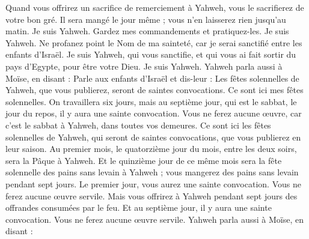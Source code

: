 \begin{multicols}{2}
Quand vous offrirez un sacrifice de remerciement à Yahweh, vous le sacrifierez de votre bon gré.
Il sera mangé le jour même ; vous n'en laisserez rien jusqu'au matin. Je suis Yahweh.
Gardez mes commandements et pratiquez-les. Je suis Yahweh.
Ne profanez point le Nom de ma sainteté, car je serai sanctifié entre les enfants d'Israël. Je suis Yahweh, qui vous sanctifie,
et qui vous ai fait sortir du pays d'Egypte, pour être votre Dieu. Je suis Yahweh.
\VerseOne{}Yahweh parla aussi à Moïse, en disant :
Parle aux enfants d'Israël et dis-leur : Les fêtes solennelles de Yahweh, que vous publierez, seront de saintes convocations. Ce sont ici mes fêtes solennelles.
On travaillera six jours, mais au septième jour, qui est le sabbat, le jour du repos, il y aura une sainte convocation. Vous ne ferez aucune œuvre, car c'est le sabbat à Yahweh, dans toutes vos demeures.
Ce sont ici les fêtes solennelles de Yahweh, qui seront de saintes convocations, que vous publierez en leur saison.
Au premier mois, le quatorzième jour du mois, entre les deux soirs, sera la Pâque à Yahweh.
Et le quinzième jour de ce même mois sera la fête solennelle des pains sans levain à Yahweh ; vous mangerez des pains sans levain pendant sept jours.
Le premier jour, vous aurez une sainte convocation. Vous ne ferez aucune œuvre servile.
Mais vous offrirez à Yahweh pendant sept jours des offrandes consumées par le feu. Et au septième jour, il y aura une sainte convocation. Vous ne ferez aucune œuvre servile.
Yahweh parla aussi à Moïse, en disant :

\end{multicols}
